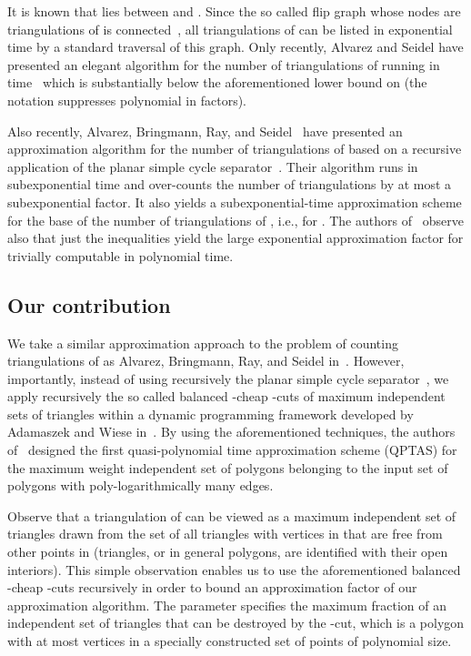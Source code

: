 \documentclass[a4paper]{article}
\begin{document}
It is known that  lies between  \cite{SSW11}
and  \cite{SS11}. Since the so called flip graph
whose nodes are triangulations of
 is connected~\cite{S78}, all triangulations of
 can be listed in exponential time by a standard
traversal of this graph. 
Only recently, Alvarez and Seidel have presented an elegant
algorithm for the number of triangulations of
 running in  time~\cite{AS13}
which is substantially below the aforementioned
lower bound on  (the  notation suppresses polynomial
in  factors).

Also recently, Alvarez, Bringmann, Ray, and Seidel~\cite{ABRS13}
have presented
an approximation algorithm for the number
of triangulations of  based on a recursive
application of the planar simple cycle separator~\cite{M86}.
Their algorithm runs in subexponential  time
and over-counts the number of
triangulations by at most a subexponential 
 factor.
It also yields a subexponential-time 
approximation scheme for the base
of the number of triangulations
of , i.e., for .
The authors of~\cite{ABRS13} observe also that
just the inequalities    
yield the large exponential approximation 
factor  
for  trivially computable
in polynomial time.

\subsection{Our contribution}

We take a similar approximation approach to the
problem of counting triangulations of 
as Alvarez, Bringmann, Ray, and Seidel in~\cite{ABRS13}. However, importantly,
instead of using recursively the planar simple cycle separator~\cite{M86}, 
we apply recursively the so called
balanced -cheap -cuts 
of maximum independent sets of triangles within
a dynamic programming framework developed
by Adamaszek and Wiese in~\cite{AW14,AW13}. 
By using the aforementioned techniques,
the authors of~\cite{AW14} designed 
the first quasi-polynomial time approximation
scheme (QPTAS) for the maximum weight independent set of
polygons belonging to the input set
of polygons with poly-logarithmically
many edges.

Observe that a triangulation of  can
be viewed as a maximum independent set
of triangles drawn from the set of
all triangles with vertices in  
that are free from other points in 
(triangles, or in general polygons, are 
identified with their open interiors).
This simple observation enables us
to use the aforementioned
balanced -cheap -cuts 
recursively in order to bound
an approximation factor of our approximation
algorithm. 
The parameter 
specifies the maximum fraction of an
independent set of triangles that can be
destroyed by the -cut, which is a polygon 
with at most  vertices in a specially constructed
set of points of polynomial size.
\end{document}
